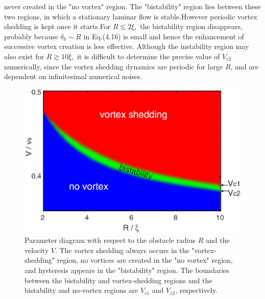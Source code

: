 \documentclass[12pt,a4paper]{report} %
\begin{document}
never created in the "no vortex" region. The "bistability"
region lies between these two regions, in which a stationary laminar
flow is stable.However periodic vortex shedding is 
kept once it starts.For $R \lesssim 2 \xi,$ the bistability region
disappears, probably because $\delta_b \sim R$ in Eq.(4.16) is small and
hence the enhancement of successive vortex creation
is less effective. Although the instability region may also
exist for $R \gtrsim 10\xi,$ it is difficult to determine the precise
value of $V_{c2}$ numerically, since the vortex shedding dynamics
are periodic for large $R$, and are dependent on
infinitesimal numerical noises.
\begin{figure}[htbp]
\begin{center}
\includegraphics[scale=0.30, keepaspectratio]{4-5.eps}
\caption{
Parameter diagram with respect to the
obstacle radius $R$ and the velocity $V$. The vortex shedding always
occurs in the "vortex-shedding" region, no vortices are created in the
"no vortex" region, and hysteresis appears in the "bistability" region.
The boundaries between the bistability and vortex-shedding regions
and the bistability and no-vortex regions are $V_{c1}$ and $V_{c2}$, respectively.
}
\label{FIG:4-5}
\end{center}
\end{figure}
\end{document}
